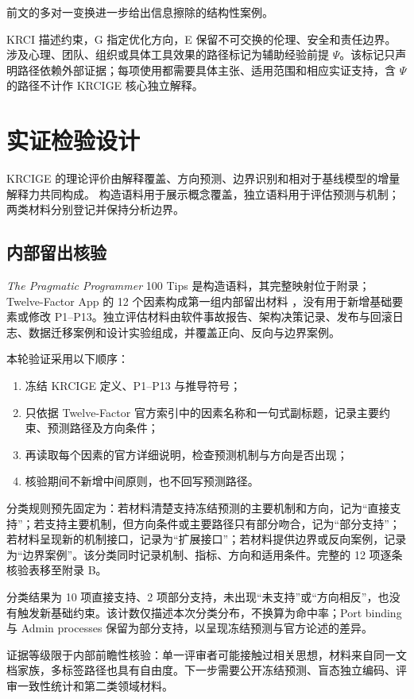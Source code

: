 \documentclass[11pt,a4paper]{ctexart}
\numberwithin{equation}{section}
\theoremstyle{definition}
\theoremstyle{plain}
\newcommand{\PP}{\textit{The Pragmatic Programmer}}
\begin{document}
前文的多对一变换进一步给出信息擦除的结构性案例。

KRCI 描述约束，G 指定优化方向，E 保留不可交换的伦理、安全和责任边界。涉及心理、团队、组织或具体工具效果的路径标记为辅助经验前提 $\Psi$。该标记只声明路径依赖外部证据；每项使用都需要具体主张、适用范围和相应实证支持，含 $\Psi$ 的路径不计作 KRCIGE 核心独立解释。

\section{实证检验设计}

KRCIGE 的理论评价由解释覆盖、方向预测、边界识别和相对于基线模型的增量解释力共同构成。
构造语料用于展示概念覆盖，独立语料用于评估预测与机制；两类材料分别登记并保持分析边界。

\subsection{内部留出核验}

\PP{} 100 Tips 是构造语料，其完整映射位于附录；Twelve-Factor App 的 12 个因素构成第一组内部留出材料 \cite{twelvefactor}，没有用于新增基础要素或修改 P1--P13。独立评估材料由软件事故报告、架构决策记录、发布与回滚日志、数据迁移案例和设计实验组成，并覆盖正向、反向与边界案例。

本轮验证采用以下顺序：
\begin{enumerate}
    \item 冻结 KRCIGE 定义、P1--P13 与推导符号；
    \item 只依据 Twelve-Factor 官方索引中的因素名称和一句式副标题，记录主要约束、预测路径及方向条件；
    \item 再读取每个因素的官方详细说明，检查预测机制与方向是否出现；
    \item 核验期间不新增中间原则，也不回写预测路径。
\end{enumerate}

分类规则预先固定为：若材料清楚支持冻结预测的主要机制和方向，记为“直接支持”；若支持主要机制，但方向条件或主要路径只有部分吻合，记为“部分支持”；若材料呈现新的机制接口，记录为“扩展接口”；若材料提供边界或反向案例，记录为“边界案例”。该分类同时记录机制、指标、方向和适用条件。完整的 12 项逐条核验表移至附录 B。

分类结果为 10 项直接支持、2 项部分支持，未出现“未支持”或“方向相反”，也没有触发新基础约束。该计数仅描述本次分类分布，不换算为命中率；Port binding 与 Admin processes 保留为部分支持，以呈现冻结预测与官方论述的差异。

证据等级限于内部前瞻性核验：单一评审者可能接触过相关思想，材料来自同一文档家族，多标签路径也具有自由度。下一步需要公开冻结预测、盲态独立编码、评审一致性统计和第二类领域材料。
\end{document}
